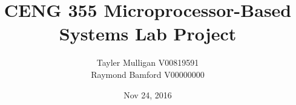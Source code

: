 \documentclass{article}
\title{CENG 355 Microprocessor-Based Systems Lab Project}
\author{Tayler Mulligan	V00819591 \\ Raymond Bamford	V00000000}
\date{Nov 24, 2016}
\begin{document}
\maketitle

\tableofcontents







\begin{appendices}

\end{appendices}
\end{document}
